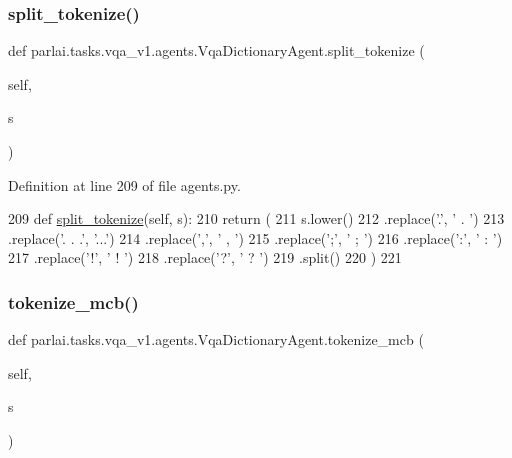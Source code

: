\subsubsection{\texorpdfstring{split\+\_\+tokenize()}{split\_tokenize()}}
{\footnotesize\ttfamily def parlai.\+tasks.\+vqa\+\_\+v1.\+agents.\+Vqa\+Dictionary\+Agent.\+split\+\_\+tokenize (\begin{DoxyParamCaption}\item[{}]{self,  }\item[{}]{s }\end{DoxyParamCaption})}



Definition at line 209 of file agents.\+py.


\begin{DoxyCode}
209     \textcolor{keyword}{def }\hyperlink{namespaceparlai_1_1mturk_1_1tasks_1_1wizard__of__wikipedia_1_1worlds_a040aaf5ecfbddec14f321279454f85a8}{split\_tokenize}(self, s):
210         \textcolor{keywordflow}{return} (
211             s.lower()
212             .replace(\textcolor{stringliteral}{'.'}, \textcolor{stringliteral}{' . '})
213             .replace(\textcolor{stringliteral}{'. . .'}, \textcolor{stringliteral}{'...'})
214             .replace(\textcolor{stringliteral}{','}, \textcolor{stringliteral}{' , '})
215             .replace(\textcolor{stringliteral}{';'}, \textcolor{stringliteral}{' ; '})
216             .replace(\textcolor{stringliteral}{':'}, \textcolor{stringliteral}{' : '})
217             .replace(\textcolor{stringliteral}{'!'}, \textcolor{stringliteral}{' ! '})
218             .replace(\textcolor{stringliteral}{'?'}, \textcolor{stringliteral}{' ? '})
219             .split()
220         )
221 
\end{DoxyCode}
\mbox{\label{classparlai_1_1tasks_1_1vqa__v1_1_1agents_1_1VqaDictionaryAgent_aa4945260a8e445852d28d702346b67e2}} 
\subsubsection{\texorpdfstring{tokenize\+\_\+mcb()}{tokenize\_mcb()}}
{\footnotesize\ttfamily def parlai.\+tasks.\+vqa\+\_\+v1.\+agents.\+Vqa\+Dictionary\+Agent.\+tokenize\+\_\+mcb (\begin{DoxyParamCaption}\item[{}]{self,  }\item[{}]{s }\end{DoxyParamCaption})}



